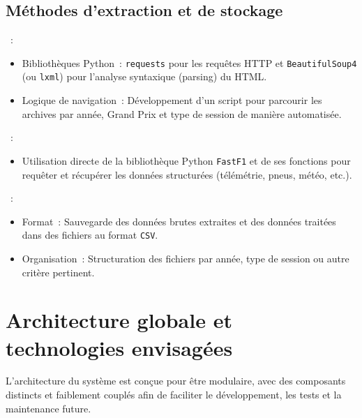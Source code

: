 \documentclass[11pt, a4paper]{article}
\newcommand{\lib}[1]{\texttt{#1}}
\begin{document}
\subsection{Méthodes d'extraction et de stockage}
\begin{description}[style=standard, itemsep=0.5em, leftmargin=1.5em]
    \item[\url{formula1.com} (Web Scraping)]~:
        \begin{itemize}[label=\textendash, itemsep=0.2em, leftmargin=*]
            \item Bibliothèques Python~: \lib{requests} pour les requêtes HTTP et \lib{BeautifulSoup4} (ou \lib{lxml}) pour l'analyse syntaxique (parsing) du HTML.
            \item Logique de navigation~: Développement d'un script pour parcourir les archives par année, Grand Prix et type de session de manière automatisée.
        \end{itemize}
    \item[\lib{FastF1} (API Client)]~:
        \begin{itemize}[label=\textendash, itemsep=0.2em, leftmargin=*]
            \item Utilisation directe de la bibliothèque Python \lib{FastF1} et de ses fonctions pour requêter et récupérer les données structurées (télémétrie, pneus, météo, etc.).
        \end{itemize}
    \item[Stockage Initial]~:
        \begin{itemize}[label=\textendash, itemsep=0.2em, leftmargin=*]
            \item Format~: Sauvegarde des données brutes extraites et des données traitées dans des fichiers au format \lib{CSV}.
            \item Organisation~: Structuration des fichiers par année, type de session ou autre critère pertinent.
        \end{itemize}
\end{description}

\newpage

\section{Architecture globale et technologies envisagées}
L'architecture du système est conçue pour être modulaire, avec des composants distincts et faiblement couplés afin de faciliter le développement, les tests et la maintenance future.
\end{document}
